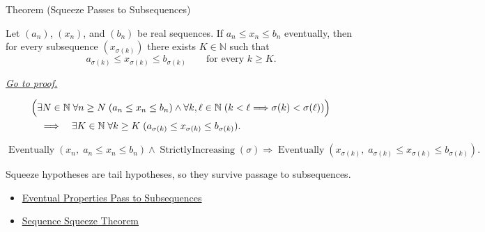\begin{theorembox}{Theorem (Squeeze Passes to Subsequences)}
\begin{theorem}
\label{thm:squeeze-passes-to-subsequences}
Let $(a_n)$, $(x_n)$, and $(b_n)$ be real sequences. If
$a_n\le x_n\le b_n$ eventually, then for every subsequence
$(x_{\sigma(k)})$ there exists $K\in\mathbb{N}$ such that
\[
  a_{\sigma(k)}\le x_{\sigma(k)}\le b_{\sigma(k)}
  \qquad
  \text{for every } k\ge K.
\]

\smallskip
\noindent
\hyperref[prf:squeeze-passes-to-subsequences]{\textit{Go to proof.}}
\end{theorem}
\end{theorembox}

\begin{remark*}
\[
\begin{aligned}
&\Bigl(
  \exists N\in\mathbb{N}\;\forall n\ge N\;(a_n\le x_n\le b_n)
  \land
  \forall k,\ell\in\mathbb{N}\;(k<\ell\Longrightarrow\sigma(k)<\sigma(\ell))
\Bigr)\\
&\quad\Longrightarrow\quad
\exists K\in\mathbb{N}\;\forall k\ge K\;
(a_{\sigma(k)}\le x_{\sigma(k)}\le b_{\sigma(k)}).
\end{aligned}
\]
\end{remark*}

\begin{remark*}
\[
\operatorname{Eventually}(x_n,\;a_n\le x_n\le b_n)
\land
\operatorname{StrictlyIncreasing}(\sigma)
\Longrightarrow
\operatorname{Eventually}(x_{\sigma(k)},\;a_{\sigma(k)}\le x_{\sigma(k)}\le b_{\sigma(k)}).
\]
\end{remark*}

\begin{remark*}[Interpretation]
Squeeze hypotheses are tail hypotheses, so they survive passage to
subsequences.
\end{remark*}

\begin{dependencies}
\begin{itemize}
  \item \hyperref[thm:eventual-properties-pass-to-subsequences]{Eventual Properties Pass to Subsequences}
  \item \hyperref[thm:sequence-squeeze-theorem]{Sequence Squeeze Theorem}
\end{itemize}
\end{dependencies}


